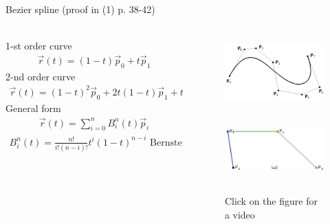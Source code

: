 \documentclass[aspectratio=169]{beamer}
\begin{document}
\begin{frame}[t]{Bezier spline (proof in (1) p. 38-42)}
\framesubtitle{}
    \begin{columns}[T,onlytextwidth]
        \begin{column}{0.59\textwidth}
            1-st order curve
            \begin{align*}
                \vec{r}(t)=(1-t)\vec{p}_{0}+t\vec{p}_{1}
            \end{align*}
            2-nd order curve
            \begin{align*}
                \vec{r}(t)=(1-t)^{2}\vec{p}_{0}+2t(1-t)\vec{p}_{1}+t^{2}\vec{p}_{2}
            \end{align*}
            General form
            \begin{align*}
                \vec{r}(t) = \sum_{i=0}^{n} B_i^n(t)\vec{p}_i
            \end{align*}
            \begin{align*}
                B_i^n(t) = \frac{n!}{i!(n-i)!}t^i(1-t)^{n-i} \text{ Bernstein polynomials}
            \end{align*}
        \end{column}
        \begin{column}{0.39\textwidth}
            \vspace{-1cm}
            \begin{figure}[H]
                \centering\includegraphics[height=2.5cm,width=1\textwidth,keepaspectratio]{bezier_spline_book.png}
                \label{fig:bezier_spline_book.png}
            \end{figure}
            \begin{figure}[H]
                    \href{https://gifyu.com/image/Sk3uW}{
                    \centering\includegraphics[height=2.5cm,width=1\textwidth,keepaspectratio]{bezier_big.png}}
                \caption*{Click on the figure for a video}
            \end{figure}
        \end{column}
    \end{columns}
\end{frame}
\end{document}
